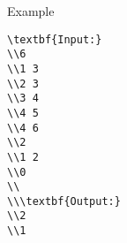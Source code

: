 Example
\begin{verbatim}
\textbf{Input:}
\\6
\\1 3
\\2 3
\\3 4
\\4 5
\\4 6
\\2
\\1 2
\\0
\\
\\\textbf{Output:}
\\2
\\1\end{verbatim}